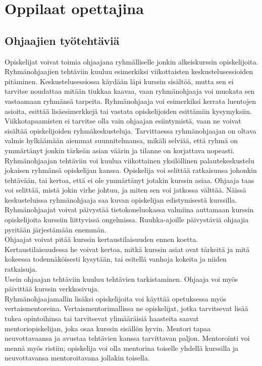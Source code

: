 \documentclass[finnish]{tktltiki2}
\theoremstyle{definition}
\theoremstyle{remark}
\begin{document}
\section{Oppilaat opettajina}

\subsection{Ohjaajien työtehtäviä}
Opiskelijat voivat toimia ohjaajana ryhmälliselle jonkin alkeiskurssin o\-pis\-ke\-li\-joi\-ta\cite{Reges88}. Ryhmänohjaajien tehtäviin kuuluu  esimerkiksi viikottaisten keskustelusessioiden pitäminen. Keskustelusessiossa käydään läpi kurssin sisältöä, mutta sen ei tarvitse noudattaa mitään tiukkaa kaavaa, vaan ryhmänohjaaja voi muokata sen vastaamaan ryhmänsä tarpeita. Ryhmänohjaaja voi esimerkiksi kerrata luentojen asioita, esittää lisäesimerkkejä tai vastata opiskelijoiden esittämiin kysymyksiin. Viikkotapaamisten ei tarvitse olla vain ohjaajan esiintymistä, vaan ne voivat sisältää opiskelijoiden ryhmäkeskusteluja.\cite{Decker06} Tarvittaessa ryhmänohjaajan on oltava valmis hylkäämään aiemmat suunnitelmansa, mikäli selviää, että ryhmä on ymmärtänyt jonkin tärkeän asian väärin ja tilanne on korjattava nopeasti.\cite{Reges88}
\\
Ryhmänohjaajan tehtäviin voi kuulua viikottainen yksilöllinen palautekeskustelu jokaisen ryhmänsä opiskelijan kanssa. Opiskelija voi selittää ratkaisunsa johonkin tehtävään, tai kertoa, että ei ole ymmärtänyt jotakin kurssin asiaa. Ohjaaja taas voi selittää, mistä jokin virhe johtuu, ja miten sen voi jatkossa välttää. Näissä keskusteluissa ryhmänohjaaja saa kuvan opiskelijan edistymisestä kurssilla.\cite{Reges88,Reges03}
\\
Ryhmänohjaajat voivat päivystää tietokoneluokassa valmiina auttamaan kurssin opiskelijoita kurssiin liittyvissä ongelmissa. Ruuhka-ajoille päivystäviä ohjaajia pyritään järjestämään enemmän.\cite{Reges88, Reges03}
\\
Ohjaajat voivat pitää kurssin kertaustilaisuuden ennen koetta. Kertaustilaisuudessa he voivat kertoa, mitkä kurssin asiat ovat tärkeitä ja mitä kokeessa todennäköisesti kysytään, tai esitellä vanhoja kokeita ja niiden ratkaisuja.\cite{Decker06}
\\
Usein ohjaajan tehtäviin kuuluu tehtävien tarkistaminen. Ohjaaja voi myös päivittää kurssin verkkosivuja.\cite{Dickson11}
\\
Ryhmänohjaajamallin lisäksi opiskelijoita voi käyttää opetuksessa myös vertaismentoreina.\cite{Tashakkori05} Vertaismentorimallissa ne opiskelijat, jotka tarvitsevat lisää tukea opintoihinsa tai tarvitsevat ylimääräisiä haasteita saavat mentoriopiskelijan, joka osaa kurssin sisällön hyvin. Mentori tapaa neuvottavaansa ja avustaa tehtävien kanssa tarvittavan paljon. Mentorointi voi mennä myös ristiin; opiskelija voi olla mentorina toiselle yhdellä kurssilla ja neuvottavansa mentoroitavana jollakin toisella.
\end{document}
